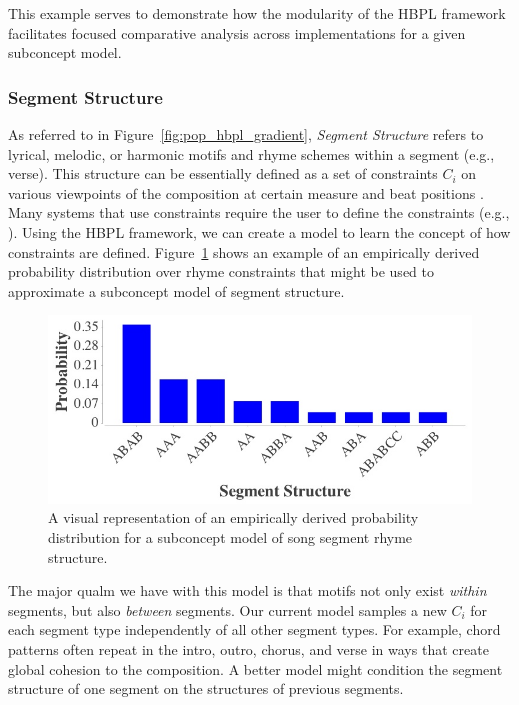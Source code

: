 \documentclass[letterpaper]{article}
\begin{document}
This example serves to demonstrate how the modularity of the HBPL framework facilitates focused comparative analysis across implementations for a given subconcept model.

\subsubsection{Segment Structure}

As referred to in Figure~\ref{fig:pop_hbpl_gradient}, \emph{Segment Structure} refers to lyrical, melodic, or harmonic motifs and rhyme schemes within a segment (e.g., verse).  This structure can be essentially defined as a set of constraints $C_i$ on various viewpoints of the composition at certain measure and beat positions \cite{bodily2017ICCC}. Many systems that use constraints require the user to define the constraints (e.g., \cite{pachet2014imitative}). Using the HBPL framework, we can create a model to learn the concept of how constraints are defined. Figure~\ref{fig:segment_structure} shows an example of an empirically derived probability distribution over rhyme constraints that might be used to approximate a subconcept model of segment structure.

\begin{figure}
	\centering
	\includegraphics[width=\linewidth]{segment_structure}
	\caption{\label{fig:segment_structure} A visual representation of an empirically derived probability distribution for a subconcept model of song segment rhyme structure.}
\end{figure}

The major qualm we have with this model is that motifs not only exist \emph{within} segments, but also \emph{between} segments. Our current model samples a new $C_i$ for each segment type independently of all other segment types. For example, chord patterns often repeat in the intro, outro, chorus, and verse in ways that create global cohesion to the composition. A better model might condition the segment structure of one segment on the structures of previous segments.
\end{document}
